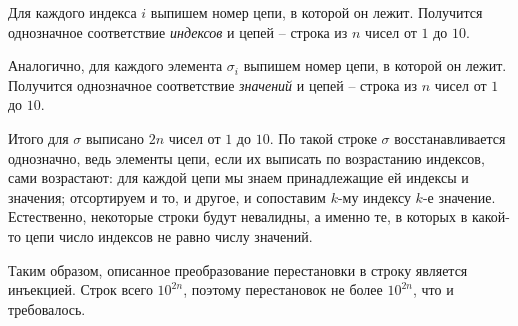 		Для каждого индекса $i$ выпишем номер цепи, в которой он лежит. Получится однозначное соответствие \textit{индексов} и цепей -- строка из $n$ чисел от $1$ до $10$.

		Аналогично, для каждого элемента $\sigma_i$ выпишем номер цепи, в которой он лежит. Получится однозначное соответствие \textit{значений} и цепей -- строка из $n$ чисел от $1$ до $10$.

		Итого для $\sigma$ выписано $2n$ чисел от $1$ до $10$. По такой строке $\sigma$ восстанавливается однозначно, ведь элементы цепи, если их выписать по возрастанию индексов, сами возрастают: для каждой цепи мы знаем принадлежащие ей индексы и значения; отсортируем и то, и другое, и сопоставим $k$-му индексу $k$-е значение. Естественно, некоторые строки будут невалидны, а именно те, в которых в какой-то цепи число индексов не равно числу значений.

		Таким образом, описанное преобразование перестановки в строку является инъекцией. Строк всего $10^{2n}$, поэтому перестановок не более $10^{2n}$, что и требовалось.


